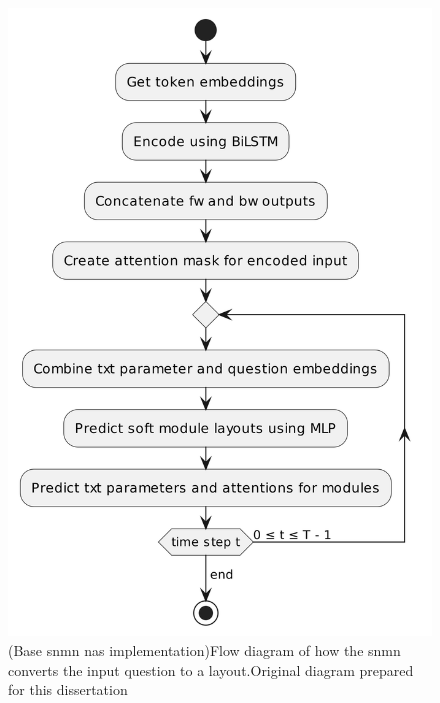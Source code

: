 \begin{figure}[htbp]
    \centering
    \includegraphics[width=.55\textwidth,keepaspectratio]{content/chapters/methodology/model_adaptation/figures/controller-layout-base-snmn.png}
    \captionsource(Base \gls{snmn} \gls{nas} implementation){Flow diagram of how the \gls{snmn} converts the input question to a layout.\label{fig:base_snmn_input_unit}}{Original diagram prepared for this dissertation}
\end{figure}

